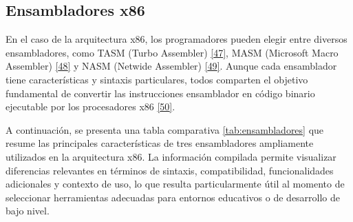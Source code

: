 \documentclass[12pt,oneside]{templates/unerthesis}
\begin{document}
\hypertarget{ensambladores-x86}{%
\subsection{Ensambladores x86}\label{ensambladores-x86}}

En el caso de la arquitectura x86, los programadores pueden elegir entre diversos ensambladores, como TASM (Turbo Assembler) \protect\hyperlink{ref-tasm}{{[}47{]}}, MASM (Microsoft Macro Assembler) \protect\hyperlink{ref-masm}{{[}48{]}} y NASM (Netwide Assembler) \protect\hyperlink{ref-nasm}{{[}49{]}}. Aunque cada ensamblador tiene características y sintaxis particulares, todos comparten el objetivo fundamental de convertir las instrucciones ensamblador en código binario ejecutable por los procesadores x86 \protect\hyperlink{ref-hyde2010art}{{[}50{]}}.

A continuación, se presenta una tabla comparativa \ref{tab:ensambladores} que resume las principales características de tres ensambladores ampliamente utilizados en la arquitectura x86. La información compilada permite visualizar diferencias relevantes en términos de sintaxis, compatibilidad, funcionalidades adicionales y contexto de uso, lo que resulta particularmente útil al momento de seleccionar herramientas adecuadas para entornos educativos o de desarrollo de bajo nivel.
\end{document}
